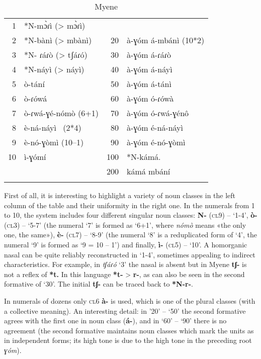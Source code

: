 \begin{table}
\caption{\label{tab:1:10} Myene }
\begin{tabularx}{\textwidth}{rXrX}
\lsptoprule

1  &*N-m{\`{ɔ}}ɾì (> m{\`{ɔ}}ɾì) & \\
2  &*N-bànì (> mbànì)  		& 20  &à-ɣóm á-mbánì      (10*2)\\
3  &*N- ɾáɾò (> tʃáɾó) 		& 30  & à-ɣóm á-ɾáɾò\\
4  &*N-náyì  (> náyì)  		& 40  & à-ɣóm á-náyì\\
5  &ò-tání 				& 50  & à-ɣóm á-tánì\\
6  &ò-ɾówá 				& 60  & à-ɣóm ó-ɾówà\\
7  &ò-ɾwá-ɣ{\'{e}}-nómò (6+1) 	& 70  & à-ɣóm ó-ɾwá-ɣ{\'{e}}n{\^{o}}\\
8  &è-ná-náyì~   (2*4) 		& 80  & à-ɣóm {\'{e}}-ná-náyì \\
9  &è-nó-ɣòmì   (10–1) 		& 90  & à-ɣóm {\'{e}}-nó-ɣòmì\\
10 & ì-ɣómí ~ 			& 100 & *N-kámá. \\
   &           						& 200 & kámá mbání\\
\lspbottomrule
\end{tabularx}
\end{table}

First of all, it is interesting to highlight a variety of noun classes in the left column of the table and their uniformity in the right one. In the numerals from 1 to 10, the system includes four different singular noun classes: \textbf{N-} (\textsc{cl}9) – ‘1-4’, \textbf{ò-} (\textsc{cl}3) – ‘5-7’ (the numeral ‘7’ is formed as ‘6+1’, where \textit{nómò} means «the only one, the same»), \textbf{è-} (\textsc{cl}7) – ‘8-9’ (the numeral ‘8’  is a reduplicated form of ‘4’, the numeral ‘9’ is formed as ‘9 = 10 – 1’) and finally, \textbf{ì-} (\textsc{cl}5) – ‘10’. A homorganic nasal can be quite reliably reconstructed in ‘1-4’, sometimes appealing to indirect characteristics. For example, in \textit{tʃáɾó} ‘3’ the nasal is absent but in Myene \textbf{tʃ-} is not a reflex of \textbf{*t.}  In this language  \textbf{*t-} > \textbf{r-}, as can also be seen in the second formative of ‘30’. The initial \textbf{tʃ-} can be traced back to \textbf{*N-r-}.

In numerals of dozens only \textsc{cl}6 \textbf{à-}  is used, which is one of the plural classes (with a collective meaning). An interesting detail: in ’20’ – ‘50’ the second formative agrees with the first one in noun class  (\textbf{á-}), and in ‘60’ – ‘90’ there is no agreement (the second formative maintains noun classes which mark the units as in independent forms; its high tone is due to the high tone in the preceding root \textit{ɣóm}). 

